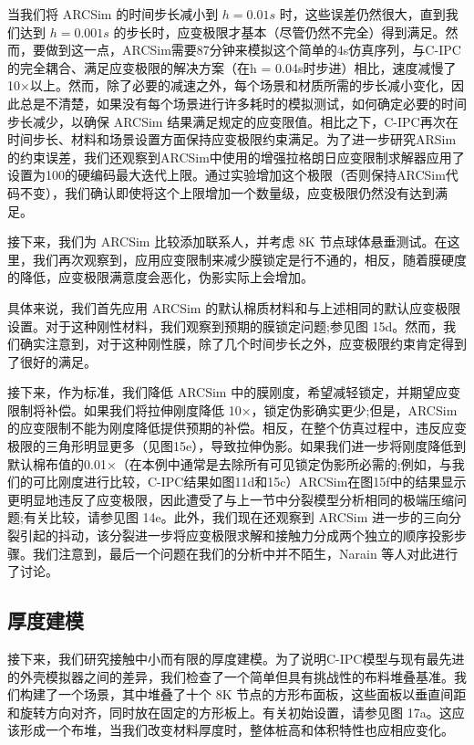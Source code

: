 当我们将 ARCSim 的时间步长减小到 $h = 0.01s$ 时，这些误差仍然很大，直到我们达到 $h = 0.001s$ 的步长时，应变极限才基本（尽管仍然不完全）得到满足。然而，要做到这一点，ARCSim需要87分钟来模拟这个简单的4s仿真序列，与C-IPC的完全耦合、满足应变极限的解决方案（在h = 0.04s时步进）相比，速度减慢了10×以上。然而，除了必要的减速之外，每个场景和材质所需的步长减小变化，因此总是不清楚，如果没有每个场景进行许多耗时的模拟测试，如何确定必要的时间步长减少，以确保 ARCSim 结果满足规定的应变限值。相比之下，C-IPC再次在时间步长、材料和场景设置方面保持应变极限约束满足。为了进一步研究ARSim的约束误差，我们还观察到ARCSim中使用的增强拉格朗日应变限制求解器应用了设置为100的硬编码最大迭代上限。通过实验增加这个极限（否则保持ARCSim代码不变），我们确认即使将这个上限增加一个数量级，应变极限仍然没有达到满足。

接下来，我们为 ARCSim 比较添加联系人，并考虑 8K 节点球体悬垂测试。在这里，我们再次观察到，应用应变限制来减少膜锁定是行不通的，相反，随着膜硬度的降低，应变极限满意度会恶化，伪影实际上会增加。

具体来说，我们首先应用 ARCSim 的默认棉质材料和与上述相同的默认应变极限设置。对于这种刚性材料，我们观察到预期的膜锁定问题;参见图 15d。然而，我们确实注意到，对于这种刚性膜，除了几个时间步长之外，应变极限约束肯定得到了很好的满足。

接下来，作为标准，我们降低 ARCSim 中的膜刚度，希望减轻锁定，并期望应变限制将补偿。如果我们将拉伸刚度降低 10×，锁定伪影确实更少;但是，ARCSim的应变限制不能为刚度降低提供预期的补偿。相反，在整个仿真过程中，违反应变极限的三角形明显更多（见图15e），导致拉伸伪影。如果我们进一步将刚度降低到默认棉布值的0.01×（在本例中通常是去除所有可见锁定伪影所必需的;例如，与我们的可比刚度进行比较，C-IPC结果如图11d和15c）ARCSim在图15f中的结果显示更明显地违反了应变极限，因此遭受了与上一节中分裂模型分析相同的极端压缩问题;有关比较，请参见图 14e。此外，我们现在还观察到 ARCSim 进一步的三向分裂引起的抖动，该分裂进一步将应变极限求解和接触力分成两个独立的顺序投影步骤。我们注意到，最后一个问题在我们的分析中并不陌生，Narain 等人对此进行了讨论。

\subsection{厚度建模}

接下来，我们研究接触中小而有限的厚度建模。为了说明C-IPC模型与现有最先进的外壳模拟器之间的差异，我们检查了一个简单但具有挑战性的布料堆叠基准。我们构建了一个场景，其中堆叠了十个 8K 节点的方形布面板，这些面板以垂直间距和旋转方向对齐，同时放在固定的方形板上。有关初始设置，请参见图 17a。这应该形成一个布堆，当我们改变材料厚度时，整体桩高和体积特性也应相应变化。

